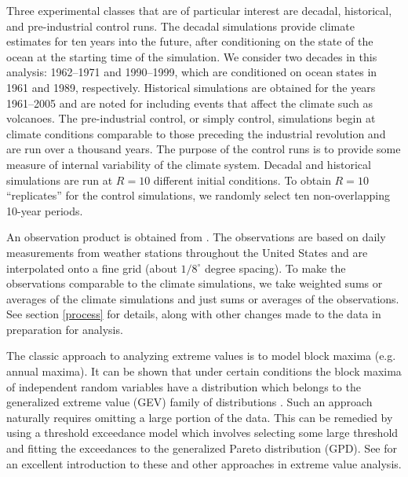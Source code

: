 Three experimental classes that are of particular interest are decadal, historical, and pre-industrial control runs. The decadal simulations provide climate estimates for ten years into the future, after conditioning on the state of the ocean at the starting time of the simulation. We consider two decades in this analysis: 1962--1971 and 1990--1999, which are conditioned on ocean states in 1961 and 1989, respectively. Historical simulations are obtained for the years 1961--2005 and are noted for including events that affect the climate such as volcanoes. The pre-industrial control, or simply control, simulations begin at climate conditions comparable to those preceding the industrial revolution and are run over a thousand years. The purpose of the control runs is to provide some measure of internal variability of the climate system. Decadal and historical simulations are run at $R=10$ different initial conditions. To obtain $R=10$ ``replicates'' for the control simulations, we randomly select ten non-overlapping 10-year periods.

An observation product is obtained from \cite{maurer2002long}. The observations are based on daily measurements from weather stations throughout the United States and are interpolated onto a fine grid (about $1/8^\circ$ degree spacing). To make the observations comparable to the climate simulations, we take weighted sums or averages of the climate simulations and just sums or averages of the observations. See section \ref{process} for details, along with other changes made to the data in preparation for analysis.

The classic approach to analyzing extreme values is to model block maxima (e.g. annual maxima). It can be shown that under certain conditions the block maxima of independent random variables have a distribution which belongs to the generalized extreme value (GEV) family of distributions \citep{coles2001introduction}. Such an approach naturally requires omitting a large portion of the data. This can be remedied by using a threshold exceedance model which involves selecting some large threshold and fitting the exceedances to the generalized Pareto distribution (GPD). See \cite{coles2001introduction} for an excellent introduction to these and other approaches in extreme value analysis.



